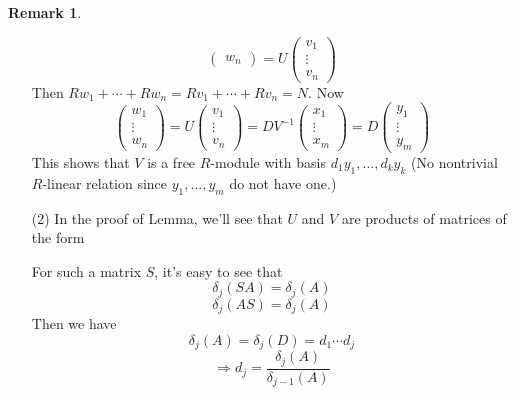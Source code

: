 \documentclass{article}
\theoremstyle{definition}
\newtheorem{rem}{Remark}
\newcommand{\Ra}{\Rightarrow}
\begin{document}
\begin{rem}
\begin{enumerate}
\[\begin{pmatrix}
					w_n
				\end{pmatrix}
				= U
				\begin{pmatrix}
					v_1\\
					\vdots\\
					v_n
				\end{pmatrix}
			\]
			Then $R w_1 + \cdots + R w_n = R v_1 + \cdots + R v_n = N$.
			Now
			\[
				\begin{pmatrix}
					w_1\\
					\vdots\\
					w_n
				\end{pmatrix}
				= U
				\begin{pmatrix}
					v_1\\
					\vdots\\
					v_n
				\end{pmatrix}
				= D V^{-1} 
				\begin{pmatrix}
					x_1\\
					\vdots\\
					x_m
				\end{pmatrix}
				= D
				\begin{pmatrix}
					y_1\\
					\vdots\\
					y_m
				\end{pmatrix}
			\]
			This shows that $V$ is a free $R$-module with basis $d_1 y_1, ..., d_k y_k$
			(No nontrivial $R$-linear relation since $y_1, ..., y_m$ do not have one.)
		\item[(2)] In the proof of Lemma, we'll see that $U$ and $V$ are products of matrices of the form\\
			
			\par For such a matrix $S$, it's easy to see that 
			\[
				\delta_j(SA) = \delta_j(A)
			\]
			\[
				\delta_j(AS) = \delta_j(A)
			\]
			Then we have 
			\[
				\delta_j(A) = \delta_j(D) = d_1 \cdots d_j
			\]
			\[
				\Ra d_j = \frac{\delta_j(A)}{\delta_{j - 1}(A)}
			\]
	\end{enumerate}
\end{rem}
\end{document}
